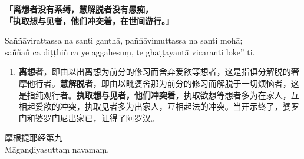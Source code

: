 \textbf{「离想者没有系缚，慧解脱者没有愚痴，\\}
\textbf{「执取想与见者，他们冲突着，在世间游行。」}

Saññāvirattassa na santi ganthā, paññāvimuttassa na santi mohā;\\
saññañ ca diṭṭhiñ ca ye aggahesuṃ, te ghaṭṭayantā vicaranti loke” ti. %

\begin{enumerate}\item \textbf{离想者}，即由以出离想为前分的修习而舍弃爱欲等想者，这是指俱分解脱的奢摩他行者。\textbf{慧解脱者}，即由以毗婆舍那为前分的修习而解脱于一切烦恼者，这是指纯观行者。\textbf{执取想与见者，他们冲突着}，执取欲想等想者多为在家人，互相起爱欲的冲突，执取见者多为出家人，互相起法的冲突。当开示终了，婆罗门和婆罗门尼出家已，证得了阿罗汉。\end{enumerate}

\begin{center}\vspace{1em}摩根提耶经第九\\Māgaṇḍiyasuttaṃ navamaṃ.\end{center}